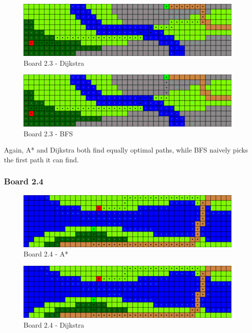\begin{figure}[h!]
  \centering
    \includegraphics[width=\textwidth]{img/board-2-3-dijkstra}
    \caption{Board 2.3 - Dijkstra}
\end{figure}

\begin{figure}[h!]
  \centering
    \includegraphics[width=\textwidth]{img/board-2-3-bfs}
    \caption{Board 2.3 - BFS}
\end{figure}

Again, A* and Dijkstra both find equally optimal paths, while BFS naively picks
the first path it can find.

\newpage

\subsubsection*{Board 2.4}

\begin{figure}[h!]
  \centering
    \includegraphics[width=\textwidth]{img/board-2-4-astar}
    \caption{Board 2.4 - A*}
\end{figure}

\begin{figure}[h!]
  \centering
    \includegraphics[width=\textwidth]{img/board-2-4-dijkstra}
    \caption{Board 2.4 - Dijkstra}
\end{figure}

